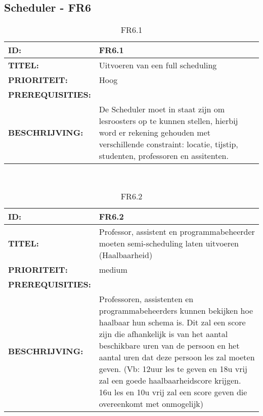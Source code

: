 \subsection{Scheduler - FR6}

\noindent\begin{table}[h]
            \begin{tabular}{l | p{10cm}}
                \textbf{ID:} & FR6.1 \\ \hline
                \textbf{TITEL:} & Uitvoeren van een full scheduling\\ \hline
                \textbf{PRIORITEIT:} &  Hoog \\ \hline
                \textbf{PREREQUISITIES:} & \\ \hline
                \textbf{BESCHRIJVING:} & De Scheduler moet in staat zijn om lesroosters op te kunnen stellen, hierbij word er rekening gehouden met verschillende constraint: locatie, tijstip, studenten, professoren en assitenten. \\
            \end{tabular}\\
            \caption{FR6.1}
            \label{tab:mysixteenthtable}
        \end{table}

\noindent\begin{table}[h]
            \begin{tabular}{l | p{10cm}}
                \textbf{ID:} & FR6.2 \\ \hline
                \textbf{TITEL:} & Professor, assistent en programmabeheerder moeten semi-scheduling laten uitvoeren (Haalbaarheid)\\ \hline
                \textbf{PRIORITEIT:} &  medium \\ \hline
                \textbf{PREREQUISITIES:} & \\ \hline
                \textbf{BESCHRIJVING:} & Professoren, assistenten en programmabeheerders kunnen bekijken hoe haalbaar hun schema is. Dit zal een score zijn die afhankelijk is van het aantal beschikbare uren van de persoon en het aantal uren dat deze persoon les zal moeten geven. (Vb: 12uur les te geven en 18u vrij zal een goede haalbaarheidscore krijgen. 16u les en 10u vrij zal een score geven die overeenkomt met onmogelijk)\\
            \end{tabular}\\
            \caption{FR6.2}
            \label{tab:mysixteenthtable}
        \end{table}
        
